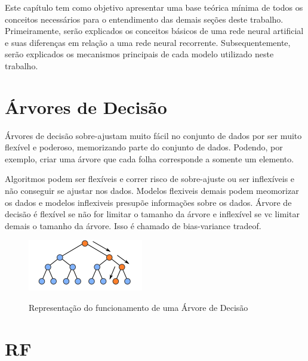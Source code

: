 
Este capítulo tem como objetivo apresentar uma base teórica mínima de todos os conceitos necessários para o entendimento das demais seções deste trabalho. Primeiramente, serão explicados os conceitos básicos de uma rede neural artificial e suas diferenças em relação a uma rede neural recorrente. Subsequentemente, serão explicados os mecanismos principais de cada modelo utilizado neste trabalho.
\section{Árvores de Decisão}


Árvores de decisão sobre-ajustam muito fácil no conjunto de dados por ser muito flexível e poderoso, memorizando parte do conjunto de dados. Podendo, por exemplo, criar uma árvore que cada folha corresponde a somente um elemento.

 Algoritmos podem ser flexíveis e correr risco de sobre-ajuste ou ser inflexíveis e não conseguir se ajustar nos dados. Modelos flexiveis demais podem  meomorizar os dados e modelos inflexiveis presupõe informações sobre os dados.
 Árvore de decisão é flexível se não for limitar o tamanho da árvore e inflexível se vc limitar demais o tamanho da árvore. Isso é chamado de bias-variance tradeof.
 
 \begin{figure}[htbp]
    \centering
    \includegraphics[scale=1.5]{monography/img/decision_tree.png}
    \label{figure:decision_tree}
    \caption[Representação do funcionamento de uma Árvore de Decisão]{Representação do funcionamento de uma Árvore de Decisão\footnotemark}
\end{figure}


\section{\acrfull{RF}}

